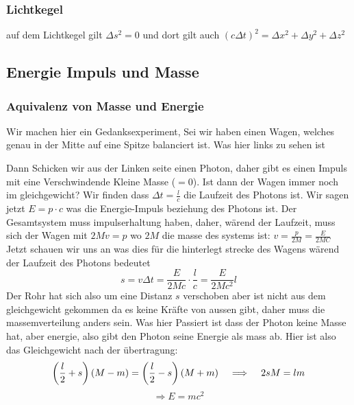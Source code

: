 \documentclass{article}
\newcommand{\mspc}{\hspace{0.4cm}}
\begin{document}
\subsubsection*{Lichtkegel} auf dem Lichtkegel gilt $\Delta s^2=0$ und dort gilt auch $(c\Delta t)^2=\Delta x^2+\Delta y^2+\Delta z^2$
\subsection*{Energie Impuls und Masse}
\subsubsection*{Aquivalenz von Masse und Energie}
\begin{multicols}{2}Wir machen hier ein Gedanksexperiment, Sei wir haben einen Wagen, welches genau in der Mitte auf eine Spitze balanciert ist. Was hier links zu sehen ist\vfill\null\columnbreak{}\end{multicols}
Dann Schicken wir aus der Linken seite einen Photon, daher gibt es einen Impuls mit eine Verschwindende Kleine Masse ($=0$). Ist dann der Wagen immer noch im gleichgewicht? Wir finden dass $\Delta t=\frac{l}{c}$ die Laufzeit des Photons ist. Wir sagen jetzt $E=p\cdot c$ was die Energie-Impuls beziehung des Photons ist. Der Gesamtsystem muss impulserhaltung haben, daher, wärend der Laufzeit, muss sich der Wagen mit $2Mv=p$ wo $2M$ die masse des systems ist: $v=\frac{p}{2M}=\frac{E}{2MC}$ Jetzt schauen wir uns an was dies für die hinterlegt strecke des Wagens wärend der Laufzeit des Photons bedeutet
\[s=v\Delta t=\frac{E}{2Mc}\cdot\frac{l}{c}=\frac{E}{2Mc^2}l\] Der Rohr hat sich also um eine Distanz $s$ verschoben aber ist nicht aus dem gleichgewicht gekommen da es keine Kräfte von aussen gibt, daher muss die massemverteilung anders sein.
Was hier Passiert ist dass der Photon keine Masse hat, aber energie, also gibt den Photon seine Energie als mass ab. Hier ist also das Gleichgewicht nach der übertragung:
\[\left(\frac{l}{2}+s\right)\left(M-m\right)=\left(\frac{l}{2}-s\right)(M+m)\mspc\Longrightarrow \mspc2sM=lm\]
\[\Longrightarrow E=mc^2\]
\end{document}

